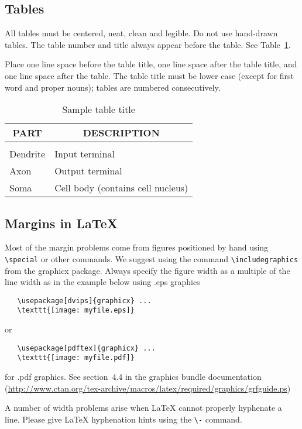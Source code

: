 \documentclass{article}
\begin{document}
    \subsection{Tables}

    All tables must be centered, neat, clean and legible. Do not use hand-drawn
    tables. The table number and title always appear before the table. See
    Table~\ref{sample-table}.

    Place one line space before the table title, one line space after the table
    title, and one line space after the table. The table title must be lower case
    (except for first word and proper nouns); tables are numbered consecutively.

    \begin{table}[t]
        \caption{Sample table title}
        \label{sample-table}
    \begin{center}
    \begin{tabular}{ll}
        \multicolumn{1}{c}{\bf PART}  &\multicolumn{1}{c}{\bf DESCRIPTION}
        \\ \hline \\
        Dendrite         &Input terminal \\
        Axon             &Output terminal \\
        Soma             &Cell body (contains cell nucleus) \\
    \end{tabular}
    \end{center}
    \end{table}

\subsection{Margins in LaTeX}

Most of the margin problems come from figures positioned by hand using
\verb+\special+ or other commands. We suggest using the command
\verb+\includegraphics+
from the graphicx package. Always specify the figure width as a multiple of
the line width as in the example below using .eps graphics
\begin{verbatim}
   \usepackage[dvips]{graphicx} ...
   \texttt{[image: myfile.eps]}
\end{verbatim}
or %
\begin{verbatim}
   \usepackage[pdftex]{graphicx} ...
   \texttt{[image: myfile.pdf]}
\end{verbatim}
for .pdf graphics.
See section~4.4 in the graphics bundle documentation (\url{http://www.ctan.org/tex-archive/macros/latex/required/graphics/grfguide.ps})

A number of width problems arise when LaTeX cannot properly hyphenate a
line. Please give LaTeX hyphenation hints using the \verb+\-+ command.

    
    
\end{document}
